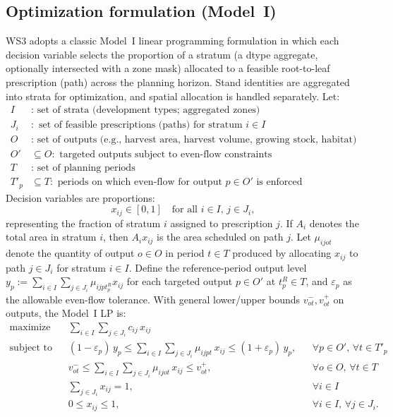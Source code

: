 \documentclass[review]{elsarticle}
\begin{document}
\subsection{Optimization formulation (Model~I)}
WS3 adopts a classic Model~I linear programming formulation \citep{johnson1977techniques, gunn2007models} in which each decision variable selects the proportion of a stratum (a dtype aggregate, optionally intersected with a zone mask) allocated to a feasible root-to-leaf prescription (path) across the planning horizon. Stand identities are aggregated into strata for optimization, and spatial allocation is handled separately. Let:
\begin{align*}
  I &: \text{ set of strata (development types; aggregated zones)} \\
  J_i &: \text{ set of feasible prescriptions (paths) for stratum } i\in I \\
  O &: \text{ set of outputs (e.g., harvest area, harvest volume, growing stock, habitat)} \\
  O'&\subseteq O: \text{ targeted outputs subject to even-flow constraints} \\
  T &: \text{ set of planning periods} \\
  T'_p&\subseteq T: \text{ periods on which even-flow for output } p\in O' \text{ is enforced}
\end{align*}
Decision variables are proportions:
\[
x_{ij}\in[0,1] \quad \text{for all } i\in I,\, j\in J_i,
\]
representing the fraction of stratum $i$ assigned to prescription $j$. If $A_i$ denotes the total area in stratum $i$, then $A_i x_{ij}$ is the area scheduled on path $j$. Let $\mu_{ijot}$ denote the quantity of output $o\in O$ in period $t\in T$ produced by allocating $x_{ij}$ to path $j\in J_i$ for stratum $i\in I$. Define the reference-period output level $y_p:=\sum_{i\in I}\sum_{j\in J_i}\mu_{ij p t_p^R}x_{ij}$ for each targeted output $p\in O'$ at $t_p^R\in T$, and $\varepsilon_p$ as the allowable even-flow tolerance. With general lower/upper bounds $v^-_{ot},v^+_{ot}$ on outputs, the Model~I LP is:
\begin{align}
\text{maximize}\quad
& \sum_{i\in I}\sum_{j\in J_i} c_{ij}\,x_{ij} \label{eq:ws3_obj}\\
\text{subject to}\quad
& (1-\varepsilon_p)\,y_p \le \sum_{i\in I}\sum_{j\in J_i}\mu_{ijpt}\,x_{ij} \le (1+\varepsilon_p)\,y_p, && \forall p\in O',\, \forall t\in T'_p \label{eq:ws3_evenflow}\\
& v^-_{ot} \le \sum_{i\in I}\sum_{j\in J_i}\mu_{ijot}\,x_{ij} \le v^+_{ot}, && \forall o\in O,\, \forall t\in T \label{eq:ws3_bounds}\\
& \sum_{j\in J_i} x_{ij} = 1, && \forall i\in I \label{eq:ws3_coverage}\\
& 0 \le x_{ij} \le 1, && \forall i\in I,\, \forall j\in J_i. \label{eq:ws3_box}
\end{align}
\end{document}
